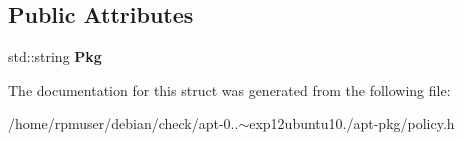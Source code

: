 \subsection*{\-Public \-Attributes}
\begin{DoxyCompactItemize}
\item 
std\-::string {\bfseries \-Pkg}\label{structpkgPolicy_1_1PkgPin_ab685b6dba76ce454949bd3674467fd2a}

\end{DoxyCompactItemize}


\-The documentation for this struct was generated from the following file\-:\begin{DoxyCompactItemize}
\item 
/home/rpmuser/debian/check/apt-\/0..$\sim$exp12ubuntu10./apt-\/pkg/policy.\-h\end{DoxyCompactItemize}
